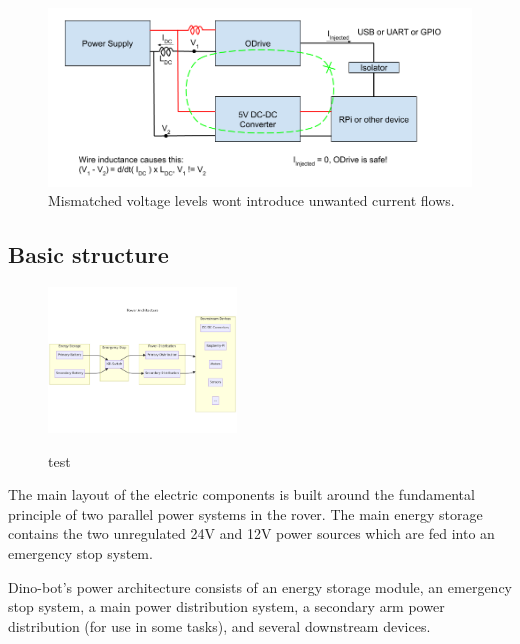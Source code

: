     \begin{figure}[h]
    \includegraphics[width=\textwidth]{contents/figures/ground_loop_fix.png}
    \caption{Mismatched voltage levels wont introduce unwanted current flows.}
    \label{ground_loop_fix}
    \end{figure}

    \clearpage
    \subsection{Basic structure}

    \begin{figure}
    \includegraphics[width=5cm]{contents/figures/power-architecture.png}
    \label{power_architecture}
    \caption{test}
    \end{figure}

    The main layout of the electric components is built around the fundamental principle of two parallel power systems in the rover. The main energy storage contains the two unregulated 24V and 12V power sources which are fed into an emergency stop system. 



    Dino-bot's power architecture consists of an energy storage module, an emergency stop system, a main
power distribution system, a secondary arm power distribution (for use in some tasks), and several
downstream devices.

    
    
